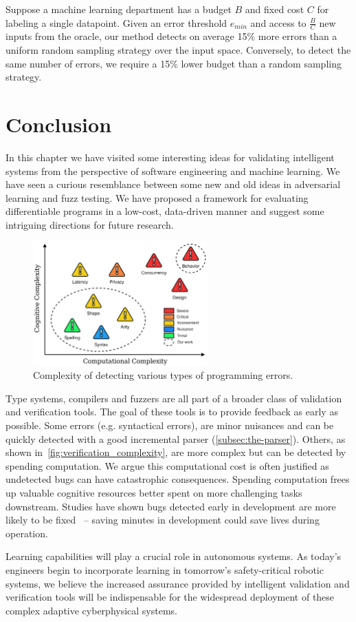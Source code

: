 Suppose a machine learning department has a budget $B$ and fixed cost $C$ for labeling a single datapoint. Given an error threshold $e_{min}$ and access to $\frac{B}{C}$ new inputs from the oracle, our method detects on average 15\% more errors than a uniform random sampling strategy over the input space. Conversely, to detect the same number of errors, we require a 15\% lower budget than a random sampling strategy.

\section{Conclusion}

In this chapter we have visited some interesting ideas for validating intelligent systems from the perspective of software engineering and machine learning. We have seen a curious resemblance between some new and old ideas in adversarial learning and fuzz testing. We have proposed a framework for evaluating differentiable programs in a low-cost, data-driven manner and suggest some intriguing directions for future research.

\begin{figure}
\centering
\includegraphics[width=0.60\textwidth]{../figures/verification_complexity.png}
\caption{Complexity of detecting various types of programming errors.}
\label{fig:verification_complexity}
\end{figure}

Type systems, compilers and fuzzers are all part of a broader class of validation and verification tools. The goal of these tools is to provide feedback as early as possible. Some errors (e.g. syntactical errors), are minor nuisances and can be quickly detected with a good incremental parser (\autoref{subsec:the-parser}). Others, as shown in~\autoref{fig:verification_complexity}, are more complex but can be detected by spending computation. We argue this computational cost is often justified as undetected bugs can have catastrophic consequences. Spending computation frees up valuable cognitive resources better spent on more challenging tasks downstream. Studies have shown bugs detected early in development are more likely to be fixed~\citep{distefano2019scaling} -- saving minutes in development could save lives during operation.

Learning capabilities will play a crucial role in autonomous systems. As today's engineers begin to incorporate learning in tomorrow's safety-critical robotic systems, we believe the increased assurance provided by intelligent validation and verification tools will be indispensable for the widespread deployment of these complex adaptive cyberphysical systems.
